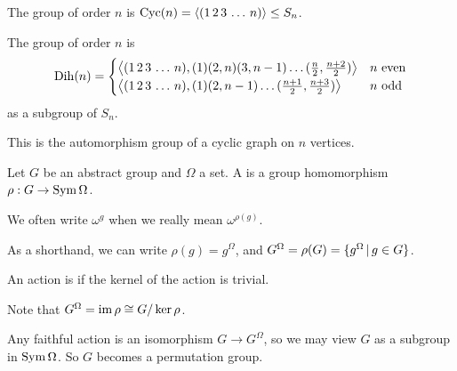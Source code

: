 \begin{definition}
  The  group of order $n$ is $\operatorname{Cyc}(n) =
  \left< (1\,2\,3\,\ldots\,n) \right> \le S_n$.
\end{definition}

\begin{definition}
  The  group of order $n$ is
  \[
	\operatorname{Dih}(n) =
	\begin{cases}
	  \left< (1\,2\,3\,\ldots\,n), (1) (2,n) (3,n-1) \ldots
	  (\frac{n}{2},\frac{n+2}{2}) \right> & \text{$n$ even} \\
	  \left<  (1\,2\,3\,\ldots\,n), (1) (2,n-1) \ldots
	  (\frac{n+1}{2},\frac{n+3}{2})  \right> & \text{$n$ odd}
	\end{cases}
  \]
  as a subgroup of $S_n$.
\end{definition}

\begin{remark}
  This is the automorphism group of a cyclic graph on $n$ vertices.
\end{remark}

\begin{definition}
  Let $G$ be an abstract group and $\Omega$ a set.
  A  is a group homomorphism $\rho: G \to \operatorname{Sym} \Omega$.
\end{definition}

\begin{remark}
  We often write $\omega^g$ when we really mean $\omega^{\rho(g)}$.
\end{remark}

\begin{remark}
  As a shorthand, we can write $\rho(g) = g^\Omega$, and $G^\Omega = \rho(G) =
  \{ g^\Omega \,|\, g \in G \}$.
\end{remark}

\begin{definition}
  An action is  if the kernel of the action is trivial.
\end{definition}

\begin{remark}
  Note that $G^\Omega = \operatorname{im} \rho \cong G / \operatorname{ker} \rho$.
\end{remark}

\begin{remark}
  Any faithful action is an isomorphism $G \to G^\Omega$, so we may view $G$ as
  a subgroup in $\operatorname{Sym} \Omega$.
  So $G$ becomes a permutation group.
\end{remark}